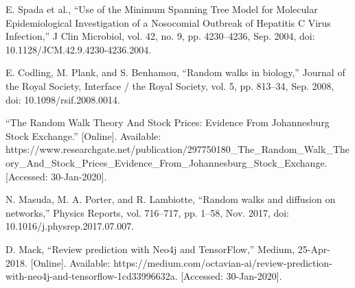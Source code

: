 \documentclass[journal,twoside,web]{ieeecolor}
\begin{document}
\begin{thebibliography}{9}
     E. Spada et al., “Use of the Minimum Spanning Tree Model for Molecular Epidemiological Investigation of a Nosocomial Outbreak of Hepatitis C Virus Infection,” J Clin Microbiol, vol. 42, no. 9, pp. 4230–4236, Sep. 2004, doi: 10.1128/JCM.42.9.4230-4236.2004.

     E. Codling, M. Plank, and S. Benhamou, “Random walks in biology,” Journal of the Royal Society, Interface / the Royal Society, vol. 5, pp. 813–34, Sep. 2008, doi: 10.1098/rsif.2008.0014.
    
     “The Random Walk Theory And Stock Prices: Evidence From Johannesburg Stock Exchange.” [Online]. Available: https://www.researchgate.net/publication/297750180{\_}The{\_}Random{\_}Walk{\_}Theory{\_}And{\_}Stock{\_}Prices{\_}Evidence{\_}From{\_}Johannesburg{\_}Stock{\_}Exchange. [Accessed: 30-Jan-2020].

     N. Masuda, M. A. Porter, and R. Lambiotte, “Random walks and diffusion on networks,” Physics Reports, vol. 716–717, pp. 1–58, Nov. 2017, doi: 10.1016/j.physrep.2017.07.007.
    
     D. Mack, “Review prediction with Neo4j and TensorFlow,” Medium, 25-Apr-2018. [Online]. Available: https://medium.com/octavian-ai/review-prediction-with-neo4j-and-tensorflow-1cd33996632a. [Accessed: 30-Jan-2020].

\end{thebibliography}
\end{document}
